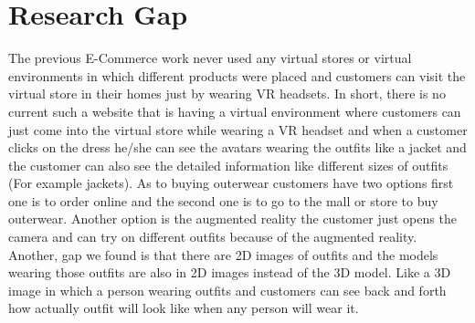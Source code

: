 \section{Research Gap}
The previous E-Commerce work never used any virtual stores or virtual environments in which different products were placed and customers can visit the virtual store in their homes just by wearing VR headsets. In short, there is no current such a website that is having a virtual environment where customers can just come into the virtual store while wearing a VR headset and when a customer clicks on the dress he/she can see the avatars wearing the outfits like a jacket and the customer can also see the detailed information like different sizes of outfits (For example jackets). As to buying outerwear customers have two options first one is to order online and the second one is to go to the mall or store to buy outerwear. Another option is the augmented reality the customer just opens the camera and can try on different outfits because of the augmented reality. 
Another, gap we found is that there are 2D images of outfits and the models wearing those outfits are also in 2D images instead of the 3D model. Like a 3D image in which a person wearing outfits and customers can see back and forth how actually outfit will look like when any person will wear it.
